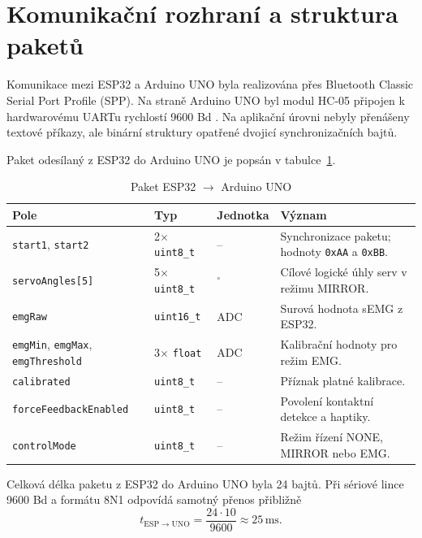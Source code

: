 \documentclass[FZS,DP]{tulthesis}
\begin{document}
\section{Komunikační rozhraní a struktura paketů}
\label{sec:komunikacni-rozhrani}

Komunikace mezi ESP32 a Arduino UNO byla realizována přes Bluetooth Classic Serial Port Profile (SPP)\@. Na straně Arduino UNO byl modul HC-05 připojen k hardwarovému UARTu rychlostí 9600 Bd \cite{hc05_components101}. Na aplikační úrovni nebyly přenášeny textové příkazy, ale binární struktury opatřené dvojicí synchronizačních bajtů.

Paket odesílaný z ESP32 do Arduino UNO je popsán v tabulce~\ref{tab:packet-esp-uno}.

\begin{table}[H]
\centering
\caption{Paket ESP32 $\rightarrow$ Arduino UNO}
\label{tab:packet-esp-uno}
\begin{tabular}{|p{}|p{}|p{}|p{}|}
\hline
\textbf{Pole} & \textbf{Typ} & \textbf{Jednotka} & \textbf{Význam} \\
\hline
\texttt{start1}, \texttt{start2} & 2$\times$ \texttt{uint8\_t} & -- & Synchronizace paketu; hodnoty \texttt{0xAA} a \texttt{0xBB}. \\
\hline
\texttt{servoAngles[5]} & 5$\times$ \texttt{uint8\_t} & $^\circ$ & Cílové logické úhly serv v režimu MIRROR\@. \\
\hline
\texttt{emgRaw} & \texttt{uint16\_t} & ADC & Surová hodnota sEMG z ESP32. \\
\hline
\texttt{emgMin}, \texttt{emgMax}, \texttt{emgThreshold} & 3$\times$ \texttt{float} & ADC & Kalibrační hodnoty pro režim EMG\@. \\
\hline
\texttt{calibrated} & \texttt{uint8\_t} & -- & Příznak platné kalibrace. \\
\hline
\texttt{forceFeedbackEnabled} & \texttt{uint8\_t} & -- & Povolení kontaktní detekce a haptiky. \\
\hline
\texttt{controlMode} & \texttt{uint8\_t} & -- & Režim řízení NONE, MIRROR nebo EMG\@. \\
\hline
\end{tabular}
\end{table}

Celková délka paketu z ESP32 do Arduino UNO byla 24 bajtů. Při sériové lince 9600 Bd a formátu 8N1 odpovídá samotný přenos přibližně
\begin{equation}
    t_{\mathrm{ESP}\rightarrow\mathrm{UNO}} =
    \frac{24 \cdot 10}{9600}
    \approx 25\,\mathrm{ms}.
\end{equation}
\end{document}
